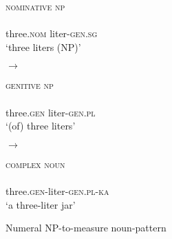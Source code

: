 \documentclass[output=paper]{langscibook}
\begin{document}
\begin{figure}\small
\hfill
\begin{minipage}{\widthof{\hspace{10pt}three.\textsc{nom} liter-\textsc{gen.sg}}}
\textsc{nominative np}\\
\\                                 
\hspace{4pt}three.\textsc{nom} liter-\textsc{gen.sg}\\
\glt \small `three liters (NP)'                                                
\end{minipage} \hfill $\rightarrow$ \hfill
\begin{minipage}{\widthof{\hspace{10pt}three.\textsc{gen} liter-\textsc{gen.pl}}}
\textsc{genitive np}\\
\\
\hspace{4pt}three.\textsc{gen} liter-\textsc{gen.pl}\\
\glt \small `(of) three liters'
\end{minipage} \hfill $\rightarrow$ \hfill
\begin{minipage}{\widthof{\hspace{10pt}three.\textsc{gen}-liter-\textsc{gen.pl}-\textsc{ka}}}
\textsc{complex noun}\\
\\
\hspace{4pt}three.\textsc{gen}-liter-\textsc{gen.pl}-\textsc{ka}\\
\glt \small `a three-liter jar'
\end{minipage}\hfill
\caption{Numeral NP-to-measure noun-pattern}\label{ex:khrizmann:7}
\end{figure}
\end{document}
